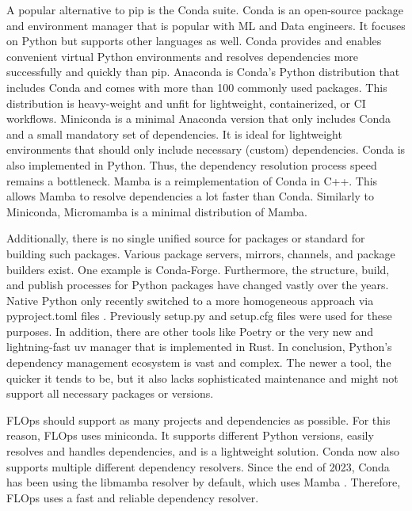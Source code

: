 A popular alternative to pip is the Conda suite.
Conda \cite{docs:conda} is an open-source package and environment manager that is popular with ML and Data engineers.
It focuses on Python but supports other languages as well.
Conda provides and enables convenient virtual Python environments and resolves dependencies more successfully and quickly than pip.
Anaconda \cite{docs:anaconda} is Conda's Python distribution that includes Conda and comes with more than 100 commonly used packages.
This distribution is heavy-weight and unfit for lightweight, containerized, or CI workflows.
Miniconda \cite{docs:miniconda} is a minimal Anaconda version that only includes Conda and a small mandatory set of dependencies.
It is ideal for lightweight environments that should only include necessary (custom) dependencies.
Conda is also implemented in Python.
Thus, the dependency resolution process speed remains a bottleneck.
Mamba \cite{docs:mamba} is a reimplementation of Conda in C++.
This allows Mamba to resolve dependencies a lot faster than Conda.
Similarly to Miniconda, Micromamba \cite{docs:micromamba} is a minimal distribution of Mamba.

Additionally, there is no single unified source for packages or standard for building such packages.
Various package servers, mirrors, channels, and package builders exist.
One example is Conda-Forge.
Furthermore, the structure, build, and publish processes for Python packages have changed vastly over the years.
Native Python only recently switched to a more homogeneous approach via pyproject.toml files \cite{setuptools_userguide}.
Previously setup.py and setup.cfg files were used for these purposes.
In addition, there are other tools like Poetry \cite{docs:poetry} or the very new and lightning-fast uv \cite{uv} manager that is implemented in Rust.
In conclusion, Python's dependency management ecosystem is vast and complex.
The newer a tool, the quicker it tends to be, but it also lacks sophisticated maintenance and might not support all necessary packages or versions.

FLOps should support as many projects and dependencies as possible.
For this reason, FLOps uses miniconda.
It supports different Python versions, easily resolves and handles dependencies, and is a lightweight solution.
Conda now also supports multiple different dependency resolvers.
Since the end of 2023, Conda has been using the libmamba resolver by default, which uses Mamba \cite{docs:conda_libmamba}.
Therefore, FLOps uses a fast and reliable dependency resolver.


